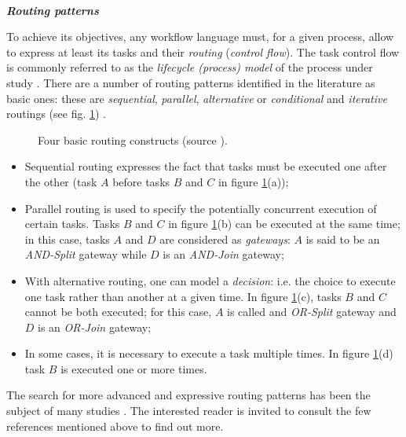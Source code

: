 ~

\noindent\textbf{\textit{Routing patterns}}

To achieve its objectives, any workflow language must, for a given process, allow to express at least its tasks and their \textit{routing} (\textit{control flow}). The task control flow is commonly referred to as the \textit{lifecycle (process) model} of the process under study \cite{divitini2001inter, hull2009facilitating}. There are a number of routing patterns identified in the literature as basic ones: these are \textit{sequential}, \textit{parallel}, \textit{alternative} or \textit{conditional} and \textit{iterative} routings (see fig. \ref{chap1:fig:basic-routing}) \cite{van1998application}.
\begin{figure}[ht!]
	\noindent
	\caption{Four basic routing constructs (source \cite{van1998application}).}
	\label{chap1:fig:basic-routing}
\end{figure}
\begin{itemize}
	\item Sequential routing expresses the fact that tasks must be executed one after the other (task $A$ before tasks $B$ and $C$ in figure \ref{chap1:fig:basic-routing}(a));
	\item Parallel routing is used to specify the potentially concurrent execution of certain tasks. Tasks $B$ and $C$ in figure \ref{chap1:fig:basic-routing}(b) can be executed at the same time; in this case, tasks $A$ and $D$ are considered as \textit{gateways}: $A$ is said to be an \textit{AND-Split} gateway while $D$ is an \textit{AND-Join} gateway;
	\item With alternative routing, one can model a \textit{decision}: i.e. the choice to execute one task rather than another at a given time. In figure \ref{chap1:fig:basic-routing}(c), tasks $B$ and $C$ cannot be both executed; for this case, $A$ is called and \textit{OR-Split} gateway and $D$ is an \textit{OR-Join} gateway;
	\item In some cases, it is necessary to execute a task multiple times.  In figure \ref{chap1:fig:basic-routing}(d) task $B$ is executed one or more times.
\end{itemize}

The search for more advanced and expressive routing patterns has been the subject of many studies \cite{van2012workflow, borger2012approaches}. The interested reader is invited to consult the few references mentioned above to find out more. 

